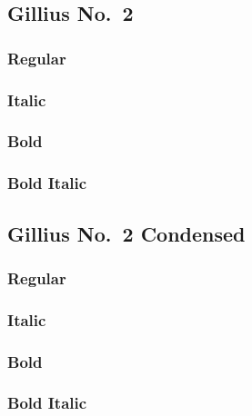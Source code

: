 \documentclass{article}
\begin{document}
\enlargethispage*{4ex}

\subsection*{Gillius No.~2}
\subsubsection*{Regular}
\lipsum[1]

\subsubsection*{Italic}
\textit{\lipsum[2]}

\subsubsection*{Bold}

\textbf{\lipsum[3]}


\subsubsection*{Bold Italic}

\textbf{\textit{\lipsum[4]}}

\subsection*{Gillius No.~2 Condensed}

\gilliustwocondensed


\subsubsection*{Regular}
\lipsum[1]

\subsubsection*{Italic}
\textit{\lipsum[2]}

\subsubsection*{Bold}

\textbf{\lipsum[3]}



\subsubsection*{Bold Italic}

\textbf{\textit{\lipsum[4]}}
\end{document}
